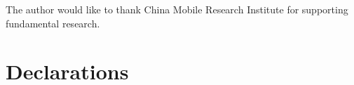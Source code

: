 \documentclass[smallextended]{svjour3}  %
\begin{document}














\appendix

















\begin{acknowledgements}
The author would like to thank China Mobile Research Institute for supporting fundamental research.
\end{acknowledgements}

\section*{Declarations}
\end{document}
